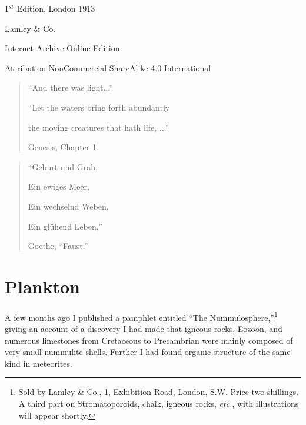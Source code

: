 \documentclass[a4paper, 12pt, oneside]{article}
\begin{document}
\begin{titlepage}
	
		
	\vspace*{\fill}%
	
	1$^{st}$ Edition, London 1913 %
	
	{\small Lamley \& Co. } %

	\vspace{1\baselineskip} %

    Internet Archive Online Edition  %
	
	{\small Attribution NonCommercial ShareAlike 4.0 International } %
\end{titlepage}
\vspace*{\fill}
\begin{quote} 
``And there was light...''

``Let the waters bring forth abundantly

the moving creatures that hath life, ...''

Genesis, Chapter 1. 
\end{quote}
\vspace{2\baselineskip}
\begin{quote} 
``Geburt und Grab,

Ein ewiges Meer,

Ein wechselnd Weben,

Ein glühend Leben,''

Goethe, ``Faust.''
\end{quote}
\vspace*{\fill}
\clearpage
\setlength{\parskip}{1mm plus1mm minus1mm}
\setcounter{tocdepth}{3}
\setcounter{secnumdepth}{3}
\tableofcontents
\clearpage
\section{Plankton}
\paragraph{}
A few months ago I published a pamphlet entitled ``The Nummulosphere,''\footnote{Sold by Lamley \& Co., 1, Exhibition Road, London, S.W. Price two shillings. A third part on Stromatoporoids, chalk, igneous rocks, \emph{etc.}, with illustrations will appear shortly.} giving an account of a discovery I had made that igneous rocks, Eozoon, and numerous limestones from Cretaceous to Precambrian were mainly composed of very small nummulite shells. Further I had found organic structure of the same kind in meteorites.
\end{document}
